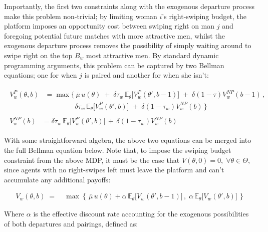 Importantly, the first two constraints along with the exogenous departure process make this problem non-trivial; by limiting woman $i$'s right-swiping budget, the platform imposes an opportunity cost between swiping right on man $j$ and foregoing potential future matches with more attractive men, whilst the exogenous departure process removes the possibility of simply waiting around to swipe right on the top $B_w$ most attractive men. By standard dynamic programming arguments, this problem can be captured by two Bellman equations; one for when $j$ is paired and another for when she isn't:

\begin{align}
    \begin{split} 
        V^{P}_w(\theta,b) &=\max \Big\{ \, \overline{\mu}\, u(\theta) \;+\; \delta \tau_w \,\mathbb{E}_\theta \Big[V^P_w(\theta', b-1)\Big] \;+\; \delta (1-\tau)V^{NP}_w(b-1) \, ,\\[6pt]
        & \quad\quad\quad\quad\;\delta \tau_w \, \mathbb{E}_\theta\Big[ V^P_w(\theta', b) \Big] \;+\; \delta (1-\tau_w) V^{NP}_w(b) \, \Big\}
    \end{split}\\[10pt]
    \begin{split}
        V^{NP}_w(b) &= {}\delta \tau_w \,\mathbb{E}_\theta \Big[ V^P_w(\theta', b)\Big] \,+\, \delta (1-\tau_w) V^{NP}_w(b)
    \end{split} 
\end{align} 

With some straightforward algebra, the above two equations can be merged into the full Bellman equation below. Note that, to impose the swiping budget constraint from the above MDP, it must be the case that $V(\theta, 0)=0, \; \forall \theta \in \Theta$, since agents with no right-swipes left must leave the platform and can't accumulate any additional payoffs:

\begin{equation}
    \begin{aligned} 
        V_w(\theta,b) \;=\;&\max\left\{\,\overline{\mu} \, u(\theta) +\alpha \,\mathbb{E}_\theta \Big[V_w(\theta', b-1)\Big]\,,\; \alpha\,\mathbb{E}_\theta \Big[ V_w(\theta', b)\Big]\,\right\}
    \end{aligned}
\end{equation}

Where $\alpha$ is the effective discount rate accounting for the exogenous possibilities of both departures and pairings, defined as: 

